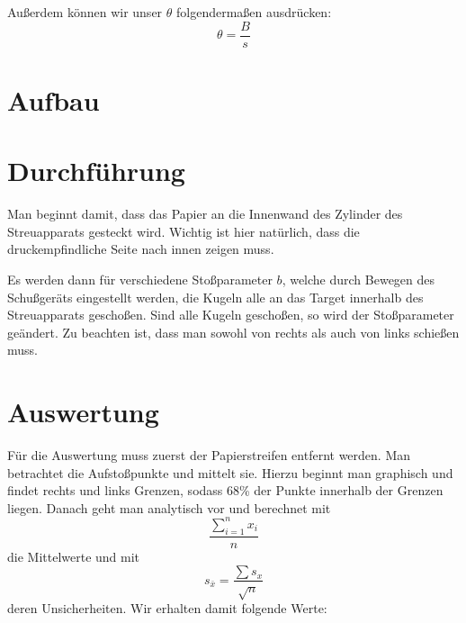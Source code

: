 \documentclass[11pt,a4paper]{article}
\newcommand{\halftime}[4]{\begin{figure}[h]
\begin{minipage}{.#1\textwidth}#3\end{minipage}\begin{minipage}{.#2\textwidth}
\centering
#4\end{minipage}
\end{figure}}
\begin{document}
Au\ss erdem k\"onnen wir unser $\theta$ folgenderma\ss en ausdr\"ucken:
\begin{equation}
\theta=\frac{B}{s}\label{eq:4}
\end{equation}

\section{Aufbau}


\section{Durchführung}

Man beginnt damit, dass das Papier an die Innenwand des Zylinder des Streuapparats gesteckt wird. Wichtig ist hier nat\"urlich, dass die druckempfindliche Seite nach innen zeigen muss.

Es werden dann f\"ur verschiedene Sto\ss parameter $b$, welche durch Bewegen des Schu\ss ger\"ats eingestellt werden, die Kugeln alle an das Target innerhalb des Streuapparats gescho\ss en. Sind alle Kugeln gescho\ss en, so wird der Sto\ss parameter ge\"andert. Zu beachten ist, dass man sowohl von rechts als auch von links schie\ss en muss.

\section{Auswertung}

F\"ur die Auswertung muss zuerst der Papierstreifen entfernt werden. Man betrachtet die Aufsto\ss punkte und mittelt sie. Hierzu beginnt man graphisch und findet rechts und links Grenzen, sodass 68\% der Punkte innerhalb der Grenzen liegen. Danach geht man analytisch vor und berechnet mit
\begin{equation}
\frac{\sum_{i=1}^n x_i}{n}\label{mean}
\end{equation}
die Mittelwerte und mit
\begin{equation}
s_{\bar{x}}=\frac{\sum{s_x}}{\sqrt{n}}\label{meanstd}
\end{equation}
deren Unsicherheiten. Wir erhalten damit folgende Werte:
\end{document}
